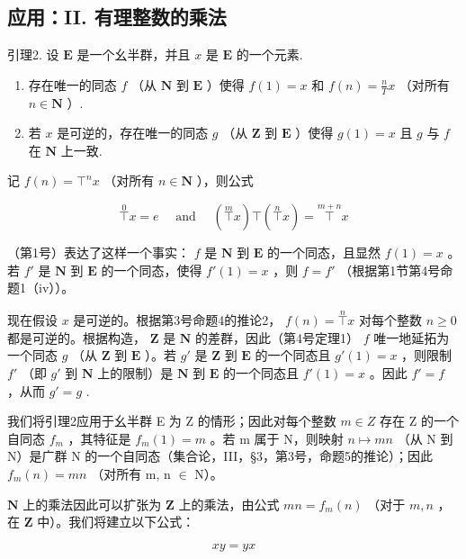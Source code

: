 \subsection{应用：II. 有理整数的乘法}

引理2. 设 \(\mathbf{E}\) 是一个幺半群，并且 \(x\) 是 \(\mathbf{E}\) 的一个元素.

\begin{enumerate}
\def\labelenumi{(\roman{enumi})}
\item
  存在唯一的同态 \(f\) （从 \(\mathbf{N}\) 到 \(\mathbf{E}\) ）使得 \(f(1) = x\) 和 \(f(n) = \frac{n}{T} x\) （对所有 \(n \in \mathbf{N}\) ）.
\item
  若 \(x\) 是可逆的，存在唯一的同态 \(g\) （从 \(\mathbf{Z}\) 到 \(\mathbf{E}\) ）使得 \(g(1) = x\) 且 \(g\) 与 \(f\) 在 \(\mathbf{N}\) 上一致.
\end{enumerate}

记 \(f(n) = \top^n x\) （对所有 \(n \in \mathbf{N}\) ），则公式

\[
\overset {0} {\top} x = e \quad \text { and } \quad \left(\overset {m} {\top} x\right) \top \left(\overset {n} {\top} x\right) = \overset {m + n} {\top} x
\]

（第1号）表达了这样一个事实： \(f\) 是 \(\mathbf{N}\) 到 \(\mathbf{E}\) 的一个同态，且显然 \(f(1) = x\) 。若 \(f'\) 是 \(\mathbf{N}\) 到 \(\mathbf{E}\) 的一个同态，使得 \(f'(1) = x\) ，则 \(f = f'\) （根据第1节第4号命题1（iv））。

现在假设 \(x\) 是可逆的。根据第3号命题4的推论2， \(f(n) = \overset{n}{\top} x\) 对每个整数 \(n \geqslant 0\) 都是可逆的。根据构造， \(\mathbf{Z}\) 是 \(\mathbf{N}\) 的差群，因此（第4号定理1） \(f\) 唯一地延拓为一个同态 \(g\) （从 \(\mathbf{Z}\) 到 \(\mathbf{E}\) ）。若 \(g'\) 是 \(\mathbf{Z}\) 到 \(\mathbf{E}\) 的一个同态且 \(g'(1) = x\) ，则限制 \(f'\) （即 \(g'\) 到 \(\mathbf{N}\) 上的限制）是 \(\mathbf{N}\) 到 \(\mathbf{E}\) 的一个同态且 \(f'(1) = x\) 。因此 \(f' = f\) ，从而 \(g' = g\) .

我们将引理2应用于幺半群 E 为 Z 的情形；因此对每个整数 \(m \in Z\) 存在 Z 的一个自同态 \(f_{m}\) ，其特征是 \(f_{m}(1) = m\) 。若 m 属于 N，则映射 \(n \mapsto mn\) （从 N 到 N）是广群 N 的一个自同态（集合论，III，§3，第3号，命题5的推论）；因此 \(f_{m}(n) = mn\) （对所有 m, n \ensuremath{\in} N）。

\(\mathbf{N}\) 上的乘法因此可以扩张为 \(\mathbf{Z}\) 上的乘法，由公式 \(mn = f_m(n)\) （对于 \(m, n\) ，在 \(\mathbf{Z}\) 中）。我们将建立以下公式：

\[
x y = y x\tag{2}
\]


